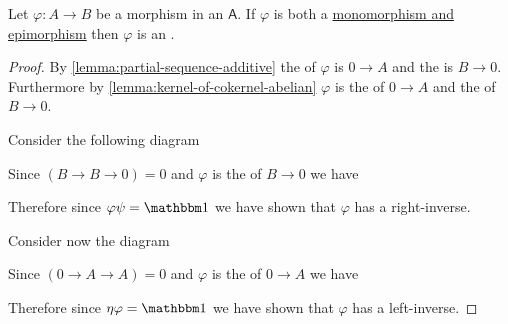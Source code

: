 \documentclass[../main.tex]{subfiles}
\begin{document}
\begin{lemma}
  Let \(\varphi: A \to B\) be a morphism in an  \(\mathsf{A}\).
  If \(\varphi\) is both a \hyperref[def:mono-epi-morphism]{monomorphism and epimorphism} then \(\varphi\) is an .
\end{lemma}
\begin{proof}
  By \autoref{lemma:partial-sequence-additive} the  of \(\varphi\) is \(0 \to A\) and the  is \(B \to 0\).
  Furthermore by \autoref{lemma:kernel-of-cokernel-abelian} \(\varphi\) is the  of \(0 \to A\) and the  of \(B \to 0\).

  Consider the following diagram
  \begin{center}
  \end{center}
  Since \((B \to B \to 0) = 0\) and \(\varphi\) is the  of \(B \to 0\) we have
  \begin{center}
  \end{center}
  Therefore since \(\varphi \psi = \id\) we have shown that \(\varphi\) has a right-inverse.

  Consider now the diagram
  \begin{center}
  \end{center}
  Since \((0 \to A \to A) = 0\) and \(\varphi\) is the  of \(0 \to A\) we have
  \begin{center}
  \end{center}
  Therefore since \(\eta \varphi = \id\) we have shown that \(\varphi\) has a left-inverse.
\end{proof}
\end{document}
